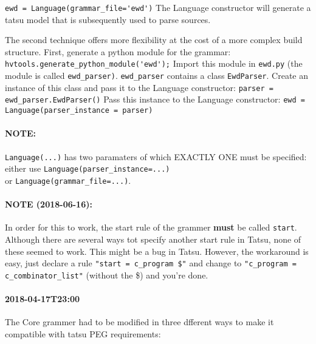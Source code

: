 \documentclass[11pt, a4paper]{article}
\begin{document}
\verb|ewd = Language(grammar_file='ewd')|
The Language constructor will generate a tatsu model that is subsequently used to parse sources.

The second technique offers more flexibility at the cost of a more complex build structure.
First, generate a python module for the grammar:\\
\verb|hvtools.generate_python_module('ewd');|
Import this module in \verb|ewd.py| (the module is called \verb|ewd_parser)|. 
\verb|ewd_parser| contains a class \verb|EwdParser|. 
Create an instance of this class and pass it to the Language constructor:
\verb|parser = ewd_parser.EwdParser()|
Pass this instance to the Language constructor:
\verb|ewd = Language(parser_instance = parser)|

\paragraph{NOTE:} \verb|Language(...)| has two paramaters of which EXACTLY ONE must be specified: either use
\verb|Language(parser_instance=...)| \\
or \verb|Language(grammar_file=...)|.

\paragraph{NOTE (2018-06-16):} In order for this to work, the start rule of the grammer \textbf{must} be called \verb|start|. 
Although there are several ways tot specify another start rule in Tatsu, none of these seemed to work. 
This might be a bug in Tatsu. 
However, the workaround is easy, just declare a rule \verb|"start = c_program $"| and change to \verb|"c_program = c_combinator_list"| (without the \$) and you're done.

\paragraph{2018-04-17T23:00}

The Core grammer had to be modified in three dfferent ways to make it compatible with tatsu PEG requirements:
\end{document}
